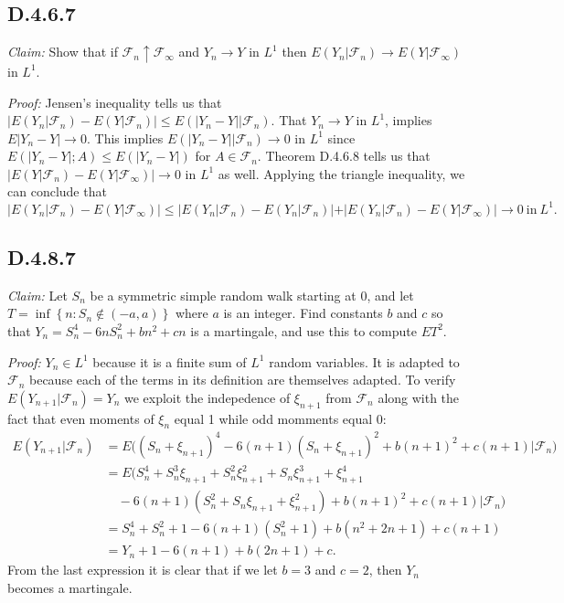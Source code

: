 \documentclass[10pt]{article}
\begin{document}
\subsection*{D.4.6.7}
\textit{Claim:} Show that if $\mathcal{F}_n \uparrow \mathcal{F}_\infty$
and $Y_n \to Y$ in $L^1$ then $E(Y_n \vert \mathcal{F}_n) \to 
E(Y \vert \mathcal{F}_\infty)$ in $L^1$.

\textit{Proof:} Jensen's inequality tells us that 
$\vert E(Y_n \vert \mathcal{F}_n) - E(Y \vert \mathcal{F}_n) \vert 
\le E(\vert Y_n - Y \vert \vert \mathcal{F}_n)$.
That $Y_n \to Y$ in $L^1$, implies $E \vert Y_n - Y \vert \to 0$.
This implies $E(\vert Y_n - Y \vert \vert \mathcal{F}_n) \to 0$ in $L^1$
since $E(\vert Y_n - Y \vert; A) \le E(\vert Y_n -Y \vert)$ for
$A \in \mathcal{F}_n$. Theorem D.4.6.8 tells us that 
$\vert E(Y \vert \mathcal{F}_n) - E(Y \vert \mathcal{F}_\infty) 
\vert \to 0$ in $L^1$ as well.
Applying the triangle inequality, we can conclude that
\begin{equation*}
  \vert E(Y_n \vert \mathcal{F}_n) - E(Y \vert \mathcal{F}_\infty) \vert
  \le \vert E(Y_n \vert \mathcal{F}_n) - E(Y_n \vert \mathcal{F}_n) \vert
  + \vert E(Y_n \vert \mathcal{F}_n) - E(Y \vert \mathcal{F}_\infty) \vert
  \to 0 \ \text{in} \ L^1.
\end{equation*}

\subsection*{D.4.8.7}
\textit{Claim:} Let $S_n$ be a symmetric simple random walk starting
at $0$, and let $T = \inf \left\{n: S_n \notin (-a,a)\right\}$
where $a$ is an integer.
Find constants $b$ and $c$ so that $Y_n = S_n^4 - 6nS_n^2 + bn^2 + cn$
is a martingale, and use this to compute $ET^2$.

\textit{Proof:} $Y_n \in L^1$ because it is a finite sum of $L^1$ random variables.
It is adapted to $\mathcal{F}_n$ because each of the terms in its definition
are themselves adapted. To verify $E(Y_{n+1} \vert \mathcal{F}_n) = Y_n$
we exploit the indepedence of $\xi_{n+1}$ from $\mathcal{F}_n$ along with the
fact that even moments of $\xi_{n}$ equal 1 while odd momments equal 0:
\begin{equation*}
\begin{aligned}
  E(Y_{n+1} \vert \mathcal{F}_n)
  & = E \big((S_n + \xi_{n+1})^4 - 6(n+1)(S_n + \xi_{n+1})^2 +b(n+1)^2 + c(n+1) \vert \mathcal{F}_n \big) \\
  & = E \big( S_n^4 + S_n^3 \xi_{n+1} + S_n^2 \xi_{n+1}^2 + S_n \xi_{n+1}^3 + \xi_{n+1}^4 \\
    & \quad -6(n+1)(S_n^2 + S_n \xi_{n+1} + \xi_{n+1}^2) + b(n+1)^2 + c(n+1) \vert \mathcal{F}_n \big) \\
  & = S_n^4 + S_n^2 + 1 - 6(n+1)(S_n^2 + 1) + b(n^2 + 2n + 1) + c(n + 1) \\
  & = Y_n + 1 - 6(n+1) + b(2n+1) + c.
\end{aligned}
\end{equation*}
From the last expression it is clear that if we let $b=3$ and $c=2$,
then $Y_n$ becomes a martingale.
\end{document}
